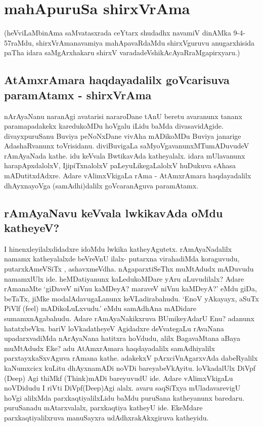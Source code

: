 \chapter{mahApuruSa shirxVrAma}

(heVviLaMbinAma saMvatasxrada ceYtarx shudadhx navamiV dinAMka 9-4-57raMdu, shirxVrAmanavamiya mahApavaRdaMdu shirxVguruvu anugarxhisida paTha idara saMgArxhakaru shirxV varadadeVshikAcAyaRraMgapirxyaru.)

\section*{AtAmxrAmara haqdayadalilx goVcarisuva paramAtamx - shirxVrAma}

nArAyaNanu naranAgi avatarisi nararoDane tAnU beretu avaranunx tananx paramapadakekx karedukoMDu hoVgalu iLidu baMda divasavidAgide. divayxpuruSanu Buviya peNoNxDane vivAha mADikoMDu Buviya janarige AdashaRvanunx toVrisidanu. diviBuvigaLa saMyoVgavanunxMTumADuvudeV rAmAyaNada kathe. idu keVvala BwtikavAda katheyalalx. idara mUlavanunx harapApxdalolxV, IjipiTxnalolxV paLeyuLikegaLalolxV huDukuva sAhasa mADutitxdAdxre. Adare vAlimxVkigaLa rAma - AtAmxrAmara haqdayadalilx dhAyxnayoVga (samAdhi)dalilx goVcaranAguva paramAtamx.

\section*{rAmAyaNavu keVvala lwkikavAda oMdu katheyeV?}

I hinenxleyilalxdidadxre idoMdu lwkika katheyAgutetx. rAmAyaNadalilx namamx katheyalalxde beVreVnU ilalx- putarxna virahadiMda koraguvudu, putarxkAmeVSiTx , ashavxmeVdha. nAgaparxtiSeThx muMtAdudx mADuvudu namamxlUlx ide. heMDatiyanunx kaLedukoMDare yAru aLuvudilalx? Adare rAmanaMte `giDaveV niVnu kaMDeyA? maraveV niVnu kaMDeyA?' eMdu giDa, beTaTx, jiMke modalAdavugaLanunx keVLadirabahudu. `EnoV yAkayayx, aSuTx PiVlf ({\eng feel}) mADikoLuLxvudu.' eMdu samAdhAna mADidare sumamxnAgabahudu. Adare rAmAyaNakikxruva BUmikeyAdarU Enu? adanunx hatatxbeVku. bariV loVkadatheyeV Agidadxre deVvategaLu rAvaNana upadarxvadiMda nArAyaNana hatitxra hoVdudu, alilx BagavaMtana aBaya muMtAdudx Eke? adu AtAmxrAmara haqdayadalilx samAdhiyalilx parxtayxkaSxvAguva rAmana kathe. adakekxV pArxciVnAgarxvAda dabeRyalilx kaNumxcicx kuLitu dhAyxnamADi noVDi bareyabeVkAyitu. loVkadalUlx DiVpf ({\eng Deep}) Agi thiMkf ({\eng Think})mADi bareyuvudU ide. Adare vAlimxVkigaLu noVDidudu I riVti DiVpf({\eng Deep})Agi alalx. avaru saqSiTxya mUladavarevigU hoVgi alilxMda parxkaqtiyalilxLidu baMdu puruSana katheyanunx baredaru. puruSanadu mAtarxvalalx, parxkaqtiya katheyU ide. EkeMdare parxkaqtiyalilxruva manuSayxra udAdhxrakAkxgiruva katheyidu.

